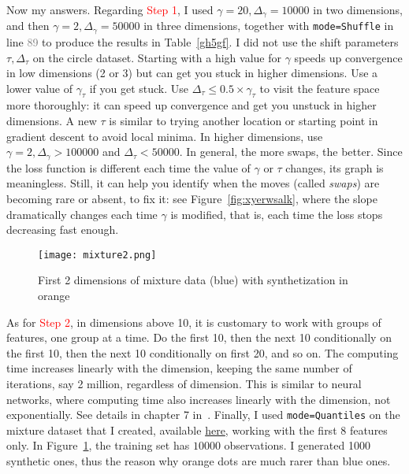 \documentclass[oneside,10pt]{book}
\begin{document}
\noindent Now my answers. Regarding \textcolor{red}{Step 1}, I used $\gamma=20, \Delta_\gamma=\num{10000}$ in two dimensions,
 and then $\gamma=2, \Delta_\gamma=\num{50000}$ in three dimensions, together with \texttt{mode=\textquotesingle Shuffle\textquotesingle} in line \textcolor{gray}{89} 
to produce the results in Table~\ref{gh5gf}. I did not use the shift parameters $\tau,\Delta_\tau$ on the circle dataset.
Starting with a high value for $\gamma$ speeds up convergence in low dimensions (2 or 3) but can get you stuck in higher dimensions.
Use a lower value of $\gamma_\tau$ if you get stuck. Use $\Delta_\tau \leq 0.5 \times \gamma_\tau$ to visit
 the feature space more thoroughly: it can speed up convergence and get you unstuck in higher dimensions. A new $\tau$ is similar to trying another
 location or starting point in \textcolor{index}{gradient descent} to avoid local minima. In higher dimensions,
 use $\gamma=2, \Delta_\gamma > \num{100000}$ and $\Delta_\tau<\num{50000}$. 
In general, the more swaps, the better. Since the loss function is different each time the value of $\gamma$ or $\tau$ changes, 
its graph is meaningless. Still, it can help you identify when the moves (called {\em swaps}) are becoming rare or absent, to fix it: 
see Figure~\ref{fig:xyerwsalk}, where the slope dramatically changes each time $\gamma$ is modified, that is, each time the loss stops decreasing fast enough.  

\begin{figure}[H]
\centering
\texttt{[image: mixture2.png]}   
\caption{First 2 dimensions of mixture data (blue) with synthetization in orange}
\label{fig:xcv2q6}
\end{figure}

As for \textcolor{red}{Step 2}, in dimensions above 10, it is customary to work with groups of features, one group at a time. Do the first 10, then 
the next 10 conditionally on the first 10, then the next 10 conditionally on first 20, and so on. The computing time increases linearly with
 the dimension, keeping the same number of iterations, say 2 million, regardless of dimension. This is similar to 
neural networks, where computing time also increases linearly with the dimension, not exponentially. See details in chapter 7 in~\cite{vgmloptim}. 
Finally, I used \texttt{mode=\textquotesingle Quantiles\textquotesingle} on the mixture dataset that I created, available \href{https://github.com/VincentGranville/Main/blob/main/mixture.csv}{here}, working with the first 8 features only. In Figure~\ref{fig:xcv2q6}, the training set has $\num{10000}$ observations. I generated 1000 synthetic ones, thus the reason why orange dots are much rarer than blue ones.
\end{document}
